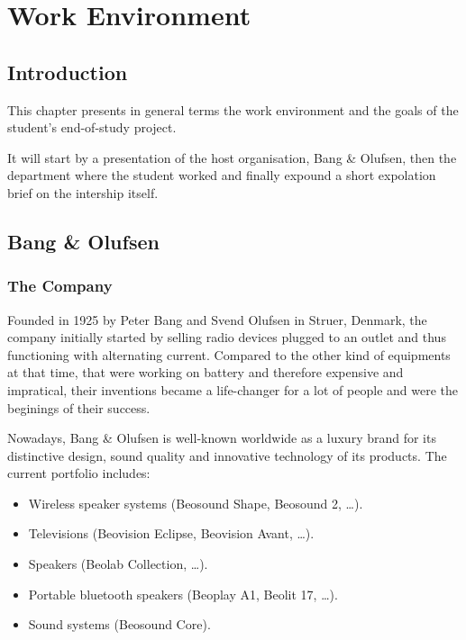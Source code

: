 
\chapter{Work Environment} %

\label{Chapter2} %



\section*{Introduction}

This chapter presents in general terms the work environment and the goals of the student's end-of-study project.

It will start by a presentation of the host organisation, Bang \& Olufsen, then the department where the student worked and finally expound a short expolation brief on the intership itself.   


\section{Bang \& Olufsen}

\subsection{The Company}

Founded in 1925 by Peter Bang and Svend Olufsen in Struer, Denmark, the company initially started by selling radio devices plugged to an outlet and thus functioning with alternating current. Compared to the other kind of equipments at that time, that were working on battery and therefore expensive and impratical, their inventions became a life-changer for a lot of people and were the beginings of their success. 

Nowadays, Bang \& Olufsen is well-known worldwide as a luxury brand for its distinctive design, sound quality and innovative technology of its products. The current portfolio includes:
\begin{itemize}
	\item Wireless speaker systems (Beosound Shape, Beosound 2, \dots).
	\item Televisions (Beovision Eclipse, Beovision Avant, \dots).
	\item Speakers (Beolab Collection, \dots).
	\item Portable bluetooth speakers (Beoplay A1, Beolit 17, \dots).
	\item Sound systems (Beosound Core).
\end{itemize}

